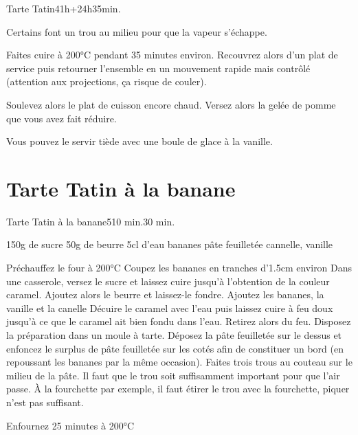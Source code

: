 {\begin{recette}{Tarte Tatin}{4}{1h+24h}{35min.}
\begin{cuisson}
Certains font un trou au milieu pour que la vapeur s'échappe.

Faites cuire à 200°C pendant 35 minutes environ. Recouvrez alors d'un plat de service puis retourner l'ensemble en 
un mouvement rapide mais contrôlé (attention aux projections, ça risque de couler).

Soulevez alors le plat de cuisson encore chaud. Versez alors la gelée de pomme que vous avez fait réduire. 

Vous pouvez le servir tiède avec une boule de glace à la vanille.


\end{cuisson}
\end{recette}

\section{Tarte Tatin à la banane}
\begin{recette}{Tarte Tatin à la banane}{5}{10 min.}{30 min.}
\begin{ingredients}
\ingredient 150g de sucre
\ingredient 50g de beurre
\ingredient 5cl d'eau
 bananes
 pâte feuilletée
\ingredient cannelle, vanille
\end{ingredients}

\begin{preparation}
\etape Préchauffez le four à 200°C
\etape Coupez les bananes en tranches d'1.5cm environ
\etape Dans une casserole, versez le sucre et laissez cuire jusqu'à l'obtention de la couleur caramel. 
\etape Ajoutez alors le beurre et laissez-le fondre. 
\etape Ajoutez les bananes, la vanille et la canelle
\etape Décuire le caramel avec l'eau puis laissez cuire à feu doux jusqu'à ce que le caramel ait bien fondu dans l'eau. Retirez 
alors du feu. 
\etape Disposez la préparation dans un moule à tarte. 
\etape Déposez la pâte feuilletée sur le dessus et enfoncez le surplus de pâte feuilletée sur les cotés afin de constituer un 
bord (en repoussant les bananes par la même occasion).
\etape Faites trois trous au couteau sur le milieu de la pâte. Il faut que le trou soit suffisamment important pour que l'air 
passe. À la fourchette par exemple, il faut étirer le trou avec la fourchette, piquer n'est pas suffisant.
\end{preparation}

\begin{cuisson}
Enfournez 25 minutes à 200°C
\end{cuisson}
\end{recette}

}
